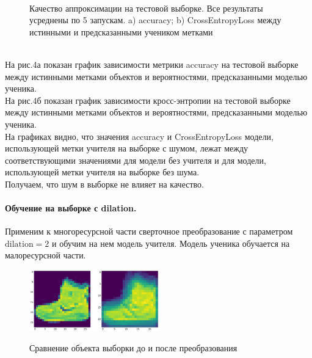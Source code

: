 \begin{figure}[h!t]\center
{}
\\
\caption{Качество аппроксимации на тестовой выборке. Все результаты усреднены по 5 запускам. a) accuracy; b) CrossEntropyLoss между истинными и предсказанными учеником метками}
\end{figure}\\
На рис.4а показан график зависимости метрики accuracy на тестовой выборке между истинными метками объектов и вероятностями, предсказанными моделью ученика.\\
На рис.4б показан график зависимости кросс-энтропии на тестовой выборке между истинными метками объектов и вероятностями, предсказанными моделью ученика.\\
На графиках видно, что значения accuracy и CrossEntropyLoss модели, использующей метки учителя на выборке с шумом, лежат между соответствующими значениями для модели без учителя и для модели, использующей метки учителя на выборке без шума.\\
Получаем, что шум в выборке не влияет на качество.

\paragraph{Обучение на выборке с dilation.}
Применим к многоресурсной части сверточное преобразование с параметром $\text{dilation}=2$ и обучим на нем модель учителя. Модель ученика обучается на малоресурсной части.\\
\begin{figure}[h!t]\center
{\includegraphics[width=0.5\textwidth]{results/dilation}}
\caption{Сравнение объекта выборки до и после преобразования}
\end{figure}\\

